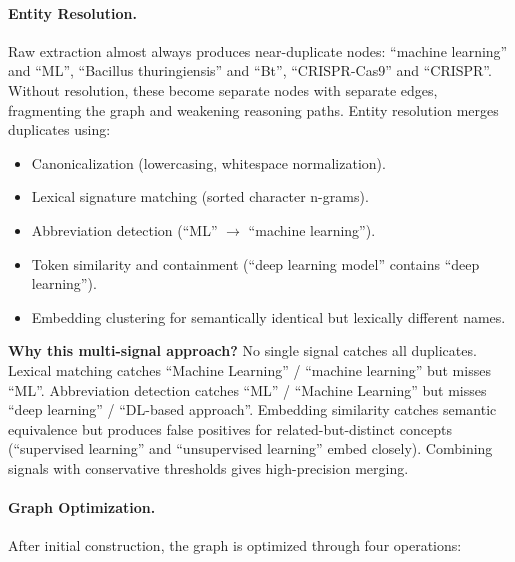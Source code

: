 \documentclass[11pt]{article}
\begin{document}
\paragraph{Entity Resolution.} Raw extraction almost always produces near-duplicate nodes: ``machine learning'' and ``ML'', ``Bacillus thuringiensis'' and ``Bt'', ``CRISPR-Cas9'' and ``CRISPR''. Without resolution, these become separate nodes with separate edges, fragmenting the graph and weakening reasoning paths. Entity resolution merges duplicates using:
\begin{itemize}[leftmargin=1.2em]
  \item Canonicalization (lowercasing, whitespace normalization).
  \item Lexical signature matching (sorted character n-grams).
  \item Abbreviation detection (``ML'' $\rightarrow$ ``machine learning'').
  \item Token similarity and containment (``deep learning model'' contains ``deep learning'').
  \item Embedding clustering for semantically identical but lexically different names.
\end{itemize}

\textbf{Why this multi-signal approach?} No single signal catches all duplicates. Lexical matching catches ``Machine Learning'' / ``machine learning'' but misses ``ML''. Abbreviation detection catches ``ML'' / ``Machine Learning'' but misses ``deep learning'' / ``DL-based approach''. Embedding similarity catches semantic equivalence but produces false positives for related-but-distinct concepts (``supervised learning'' and ``unsupervised learning'' embed closely). Combining signals with conservative thresholds gives high-precision merging.

\paragraph{Graph Optimization.} After initial construction, the graph is optimized through four operations:
\end{document}
